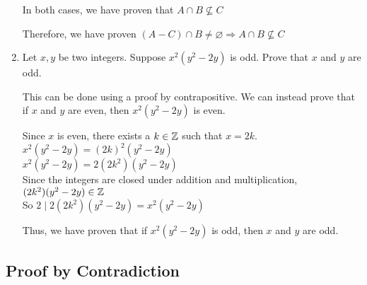 \documentclass[12pt, leqno]{article}
\begin{document}
\begin{enumerate}
    In both cases, we have proven that $A \cap B \not\subseteq C$

    Therefore, we have proven $(A - C) \cap B \neq \varnothing \Rightarrow A \cap B \not\subseteq C$

    \item Let $x, y$ be two integers. Suppose $x^2(y^2 - 2y)$ is odd. Prove that $x$ and $y$ are odd.

    This can be done using a proof by contrapositive. We can instead prove that if $x$ and $y$ are even, then $x^2(y^2 - 2y)$ is even.

    Since $x$ is even, there exists a $k \in \mathbb Z$ such that $x = 2k$.\\
    $x^2(y^2 - 2y) = (2k)^2(y^2 - 2y)$\\
    $x^2(y^2 - 2y) = 2(2k^2)(y^2 - 2y)$\\
    Since the integers are closed under addition and multiplication, $(2k^2)(y^2 - 2y) \in \mathbb Z$\\
    So $2 \mid 2(2k^2)(y^2 - 2y) = x^2(y^2 - 2y)$

    Thus, we have proven that if $x^2(y^2 - 2y)$ is odd, then $x$ and $y$ are odd.
\end{enumerate}

\subsection{Proof by Contradiction}
\end{document}
